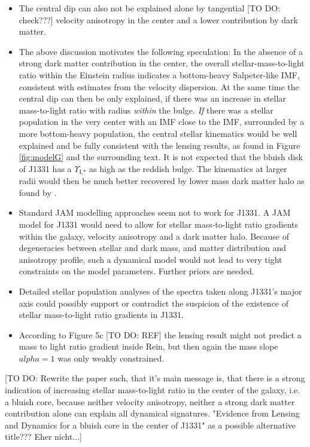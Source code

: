 \begin{itemize}
\item The central dip can also not be explained alone by tangential [TO DO: check???] velocity anisotropy in the center and a lower contribution by dark matter.
\item The above discussion motivates the following speculation: In the absence of a strong dark matter contribution in the center, the overall stellar-mass-to-light ratio within the Einstein radius indicates a bottom-heavy Salpeter-like IMF, consistent with estimates from the velocity dispersion. At the same time the central dip can then be only explained, if there was an increase in stellar mass-to-light ratio with radius \textit{within} the bulge. \emph{If} there was a stellar population in the very center with an IMF close to the \citet{Chabrier2003} IMF, surrounded by a more bottom-heavy population, the central stellar kinematics would be well explained and be fully consistent with the lensing results, as found in Figure \ref{fig:modelG} and the surrounding text. It is not expected that the bluish disk of J1331 has a $\Upsilon_\text{I,*}$ as high as the reddish bulge. The kinematics at larger radii would then be much better recovered by lower mass dark matter halo as found by \citet{SWELLSV}.
\item Standard JAM modelling approaches seem not to work for J1331. A JAM model for J1331 would need to allow for stellar mass-to-light ratio gradients within the galaxy, velocity anisotropy and a dark matter halo. Because of degeneracies between stellar and dark mass, and matter distribution and anisotropy profile, such a dynamical model would not lead to very tight constraints on the model parameters. Further priors are needed.
\item Detailed stellar population analyses of the spectra taken along J1331's major axis could possibly support or contradict the suspicion of the existence of stellar mass-to-light ratio gradients in J1331.
\item According to Figure 5c [TO DO: REF] the lensing result might not predict a mass to light ratio gradient inside Rein, but then again the mass slope $alpha=1$ was only weakly constrained.
\end{itemize}

[TO DO: Rewrite the paper such, that it's main message is, that there is a strong indication of increasing stellar mass-to-light ratio in the center of the galaxy, i.e. a bluish core, because neither velocity anisotropy, neither a strong dark matter contribution alone can explain all dynamical signatures. "Evidence from Lensing and Dynamics for a bluish core in the center of J1331" as a possible alternative title??? Eher nicht...]

